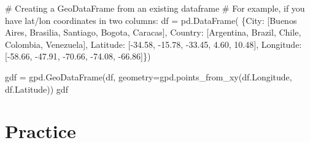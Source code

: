 \documentclass[
  letterpaper,
  DIV=11,
  numbers=noendperiod]{scrreprt}
\newenvironment{Shaded}{\begin{snugshade}}{\end{snugshade}}
\newcommand{\CommentTok}[1]{\textcolor[rgb]{0.37,0.37,0.37}{#1}}
\newcommand{\FloatTok}[1]{\textcolor[rgb]{0.68,0.00,0.00}{#1}}
\newcommand{\NormalTok}[1]{\textcolor[rgb]{0.00,0.23,0.31}{#1}}
\newcommand{\OperatorTok}[1]{\textcolor[rgb]{0.37,0.37,0.37}{#1}}
\newcommand{\StringTok}[1]{\textcolor[rgb]{0.13,0.47,0.30}{#1}}
\begin{document}
\begin{Shaded}
\begin{Highlighting}[]
\CommentTok{\# Creating a GeoDataFrame from an existing dataframe}
\CommentTok{\# For example, if you have lat/lon coordinates in two columns:}
\NormalTok{df }\OperatorTok{=}\NormalTok{ pd.DataFrame(}
\NormalTok{    \{}\StringTok{\textquotesingle{}City\textquotesingle{}}\NormalTok{: [}\StringTok{\textquotesingle{}Buenos Aires\textquotesingle{}}\NormalTok{, }\StringTok{\textquotesingle{}Brasilia\textquotesingle{}}\NormalTok{, }\StringTok{\textquotesingle{}Santiago\textquotesingle{}}\NormalTok{, }\StringTok{\textquotesingle{}Bogota\textquotesingle{}}\NormalTok{, }\StringTok{\textquotesingle{}Caracas\textquotesingle{}}\NormalTok{],}
     \StringTok{\textquotesingle{}Country\textquotesingle{}}\NormalTok{: [}\StringTok{\textquotesingle{}Argentina\textquotesingle{}}\NormalTok{, }\StringTok{\textquotesingle{}Brazil\textquotesingle{}}\NormalTok{, }\StringTok{\textquotesingle{}Chile\textquotesingle{}}\NormalTok{, }\StringTok{\textquotesingle{}Colombia\textquotesingle{}}\NormalTok{, }\StringTok{\textquotesingle{}Venezuela\textquotesingle{}}\NormalTok{],}
     \StringTok{\textquotesingle{}Latitude\textquotesingle{}}\NormalTok{: [}\OperatorTok{{-}}\FloatTok{34.58}\NormalTok{, }\OperatorTok{{-}}\FloatTok{15.78}\NormalTok{, }\OperatorTok{{-}}\FloatTok{33.45}\NormalTok{, }\FloatTok{4.60}\NormalTok{, }\FloatTok{10.48}\NormalTok{],}
     \StringTok{\textquotesingle{}Longitude\textquotesingle{}}\NormalTok{: [}\OperatorTok{{-}}\FloatTok{58.66}\NormalTok{, }\OperatorTok{{-}}\FloatTok{47.91}\NormalTok{, }\OperatorTok{{-}}\FloatTok{70.66}\NormalTok{, }\OperatorTok{{-}}\FloatTok{74.08}\NormalTok{, }\OperatorTok{{-}}\FloatTok{66.86}\NormalTok{]\})}
\end{Highlighting}
\end{Shaded}

\begin{Shaded}
\begin{Highlighting}[]
\NormalTok{gdf }\OperatorTok{=}\NormalTok{ gpd.GeoDataFrame(df, geometry}\OperatorTok{=}\NormalTok{gpd.points\_from\_xy(df.Longitude, df.Latitude))}
\NormalTok{gdf}
\end{Highlighting}
\end{Shaded}


\chapter{Practice}\label{practice}
\end{document}
